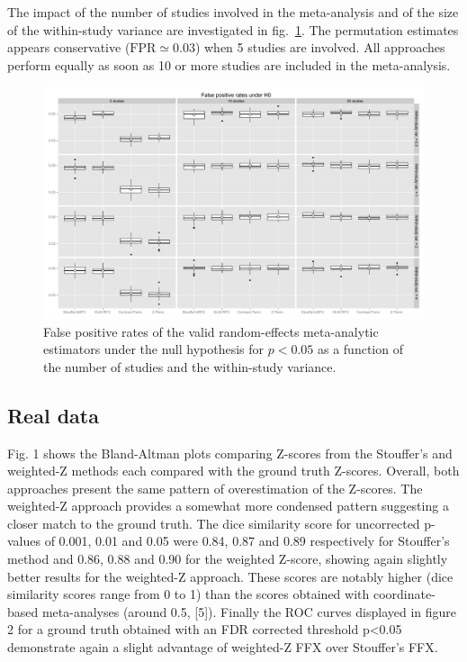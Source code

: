 \documentclass{llncs}
\begin{document}
The impact of the number of studies involved in the meta-analysis and of the size of the within-study variance are investigated in fig.~\ref{fig_fpr_valid}. The permutation estimates appears conservative ($\text{FPR}\simeq 0.03$) when 5 studies are involved. All approaches perform equally as soon as 10 or more studies are included in the meta-analysis. 
\begin{figure}[ht]
	\centering
	\includegraphics[width=\linewidth]{./Rplot_valids.pdf}
	\caption{False positive rates of the valid random-effects meta-analytic estimators under the null hypothesis for $p<0.05$ as a function of the number of studies and the within-study variance.}
	\label{fig_fpr_valid}
\end{figure}


\subsection{Real data}
Fig. 1 shows the Bland-Altman plots comparing Z-scores from the Stouffer's and weighted-Z methods each compared with the ground truth Z-scores. Overall, both approaches present the same pattern of overestimation of the Z-scores. The weighted-Z approach provides a somewhat more condensed pattern suggesting a closer match to the ground truth.
The dice similarity score for uncorrected p-values of 0.001, 0.01 and 0.05 were 0.84, 0.87 and 0.89 respectively for Stouffer's method and 0.86, 0.88 and 0.90 for the weighted Z-score, showing again slightly better results for the weighted-Z approach. These scores are notably higher (dice similarity scores range from 0 to 1) than the scores obtained with coordinate-based meta-analyses (around 0.5, [5]).
Finally the ROC curves displayed in figure 2 for a ground truth obtained with an FDR corrected threshold p<0.05 demonstrate again a slight advantage of weighted-Z FFX over Stouffer's FFX.
\end{document}
